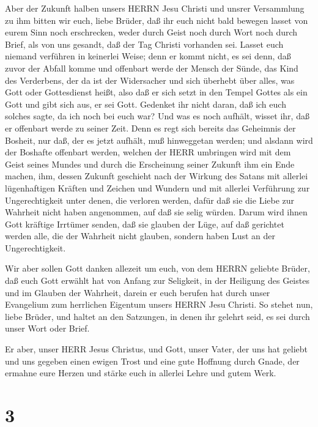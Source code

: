  Aber der Zukunft halben unsers HERRN Jesu Christi und
unsrer Versammlung zu ihm bitten wir euch, liebe Brüder, 
daß ihr euch nicht bald bewegen lasset von eurem Sinn noch erschrecken,
weder durch Geist noch durch Wort noch durch Brief, als von uns gesandt,
daß der Tag Christi vorhanden sei.  Lasset euch niemand
verführen in keinerlei Weise; denn er kommt nicht, es sei denn, daß
zuvor der Abfall komme und offenbart werde der Mensch der Sünde, das
Kind des Verderbens,  der da ist der Widersacher und sich
überhebt über alles, was Gott oder Gottesdienst heißt, also daß er sich
setzt in den Tempel Gottes als ein Gott und gibt sich aus, er sei Gott.
 Gedenket ihr nicht daran, daß ich euch solches sagte, da
ich noch bei euch war?  Und was es noch aufhält, wisset ihr,
daß er offenbart werde zu seiner Zeit.  Denn es regt sich
bereits das Geheimnis der Bosheit, nur daß, der es jetzt aufhält, muß
hinweggetan werden;  und alsdann wird der Boshafte offenbart
werden, welchen der HERR umbringen wird mit dem Geist seines Mundes und
durch die Erscheinung seiner Zukunft ihm ein Ende machen, 
ihm, dessen Zukunft geschieht nach der Wirkung des Satans mit allerlei
lügenhaftigen Kräften und Zeichen und Wundern  und mit
allerlei Verführung zur Ungerechtigkeit unter denen, die verloren
werden, dafür daß sie die Liebe zur Wahrheit nicht haben angenommen, auf
daß sie selig würden.  Darum wird ihnen Gott kräftige
Irrtümer senden, daß sie glauben der Lüge,  auf daß
gerichtet werden alle, die der Wahrheit nicht glauben, sondern haben
Lust an der Ungerechtigkeit.

 Wir aber sollen Gott danken allezeit um euch, von dem
HERRN geliebte Brüder, daß euch Gott erwählt hat von Anfang zur
Seligkeit, in der Heiligung des Geistes und im Glauben der Wahrheit,
 darein er euch berufen hat durch unser Evangelium zum
herrlichen Eigentum unsers HERRN Jesu Christi.  So stehet
nun, liebe Brüder, und haltet an den Satzungen, in denen ihr gelehrt
seid, es sei durch unser Wort oder Brief.

 Er aber, unser HERR Jesus Christus, und Gott, unser Vater,
der uns hat geliebt und uns gegeben einen ewigen Trost und eine gute
Hoffnung durch Gnade,  der ermahne eure Herzen und stärke
euch in allerlei Lehre und gutem Werk.

\hypertarget{section-2}{%
\section{3}\label{section-2}}


